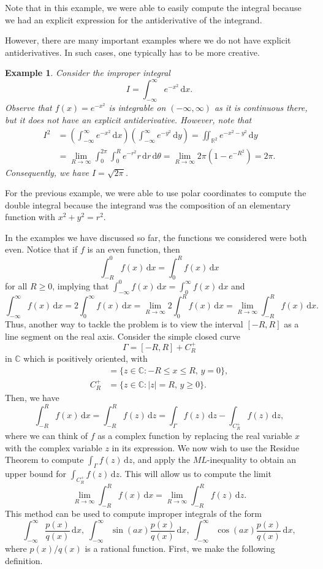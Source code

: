 \documentclass[10pt]{article}
\newcommand{\R}{\mathbb{R}}
\newcommand{\C}{\mathbb{C}}
\newcommand{\dd}{\,\mathrm{d}}
\theoremstyle{newstyle}
\newtheorem{exmp}[thm]{Example}
\begin{document}
Note that in this example, we were able to easily compute the integral because we had an explicit 
expression for the antiderivative of the integrand. 

However, there are many important examples where we do not have explicit antiderivatives. In such 
cases, one typically has to be more creative. 

\begin{exmp}
Consider the improper integral 
\[ I = \int_{-\infty}^\infty e^{-x^2} \dd x. \]
Observe that $f(x) = e^{-x^2}$ is integrable on $(-\infty, \infty)$ as it is continuous there, but 
it does not have an explicit antiderivative. However, note that 
\begin{align*}
    I^2 &= \left( \int_{-\infty}^\infty e^{-x^2} \dd x \right) \left( \int_{-\infty}^\infty e^{-y^2} \dd y 
    \right) 
    = \iint_{\R^2} e^{-x^2-y^2} \dd y \\
    &= \lim_{R\to\infty} \int_0^{2\pi} \int_0^R e^{-r^2} r \dd r \dd \theta 
    = \lim_{R\to\infty} 2\pi\left(1-e^{-R^2}\right) = 2\pi. 
\end{align*}
Consequently, we have $I = \sqrt{2\pi}$. 
\end{exmp}

For the previous example, we were able to use polar coordinates to compute the double integral because 
the integrand was the composition of an elementary function with $x^2 + y^2 = r^2$. 

In the examples we have discussed so far, the functions we considered were both even. 
Notice that if $f$ is an even function, then 
\[ \int_{-R}^0 f(x)\dd x = \int_0^R f(x)\dd x \]
for all $R \geq 0$, implying that $\int_{-\infty}^0 f(x)\dd x = \int_0^\infty f(x)\dd x$ and 
\[ \int_{-\infty}^\infty f(x)\dd x = 2\int_0^\infty f(x)\dd x = \lim_{R\to\infty} 2 \int_0^R f(x)\dd x 
= \lim_{R \to\infty} \int_{-R}^R f(x)\dd x. \]
Thus, another way to tackle the problem is to view the interval $[-R, R]$ as a line segment 
on the real axis. Consider the simple closed curve 
\[ \Gamma = [-R, R] + C_R^+ \] 
in $\C$ which is positively oriented, with 
\begin{align*}
    [-R, R] &= \{z \in \C : -R \leq x \leq R,\, y = 0\}, \\
    C_R^+ &= \{z \in \C : |z| = R,\, y \geq 0\}. 
\end{align*}
Then, we have 
\[ \int_{-R}^R f(x)\dd x = \int_{-R}^R f(z)\dd z = \int_\Gamma f(z)\dd z - \int_{C_R^+} f(z)\dd z, \]
where we can think of $f$ as a complex function by replacing the real variable $x$ 
with the complex variable $z$ in its expression. We now wish to use the Residue Theorem to compute 
$\int_\Gamma f(z)\dd z$, and apply the $ML$-inequality to obtain an upper bound for 
$\int_{C_R^+} f(z)\dd z$. This will allow us to compute the limit 
\[ \lim_{R\to\infty} \int_{-R}^R f(x)\dd x = \lim_{R\to\infty} \int_{-R}^R f(z)\dd z. \]
This method can be used to compute improper integrals of the form 
\[ \int_{-\infty}^\infty \frac{p(x)}{q(x)}\dd x,\; \int_{-\infty}^\infty 
\sin(ax)\frac{p(x)}{q(x)}\dd x,\; \int_{-\infty}^\infty \cos(ax)\frac{p(x)}{q(x)}\dd x, \]
where $p(x)/q(x)$ is a rational function. 
First, we make the following definition. 
\end{document}
